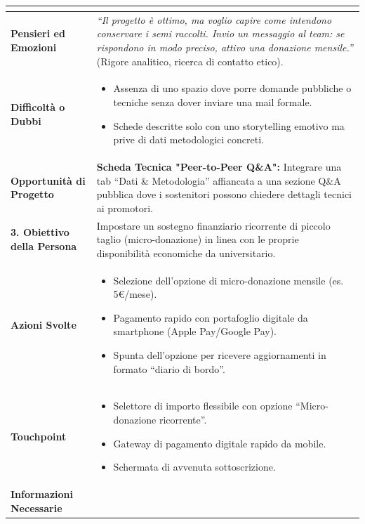 \documentclass[11pt,a4paper]{article}
\begin{document}
\begin{table}[h!]
\begin{tabular}{|p{3.2cm}|p{11.8cm}|}
\begin{itemize}[leftmargin=*,nosep]
\end{itemize} \\ \hline
\textbf{Pensieri ed Emozioni} &
\textit{``Il progetto è ottimo, ma voglio capire come intendono conservare i semi raccolti. Invio un messaggio al team: se rispondono in modo preciso, attivo una donazione mensile.''} (Rigore analitico, ricerca di contatto etico). \\ \hline
\textbf{Difficoltà o Dubbi} &
\begin{itemize}[leftmargin=*,nosep]
    \item Assenza di uno spazio dove porre domande pubbliche o tecniche senza dover inviare una mail formale.
    \item Schede descritte solo con uno storytelling emotivo ma prive di dati metodologici concreti.
\end{itemize} \\ \hline
\textbf{Opportunità di Progetto} &
\textbf{Scheda Tecnica "Peer-to-Peer Q\&A":} Integrare una tab ``Dati \& Metodologia'' affiancata a una sezione Q\&A pubblica dove i sostenitori possono chiedere dettagli tecnici ai promotori. \\ \hline
\hline
\textbf{3. Obiettivo della Persona} & Impostare un sostegno finanziario ricorrente di piccolo taglio (micro-donazione) in linea con le proprie disponibilità economiche da universitario. \\ \hline
\textbf{Azioni Svolte} &
\begin{itemize}[leftmargin=*,nosep]
    \item Selezione dell'opzione di micro-donazione mensile (es. 5€/mese).
    \item Pagamento rapido con portafoglio digitale da smartphone (Apple Pay/Google Pay).
    \item Spunta dell'opzione per ricevere aggiornamenti in formato ``diario di bordo''.
\end{itemize} \\ \hline
\textbf{Touchpoint} &
\begin{itemize}[leftmargin=*,nosep]
    \item Selettore di importo flessibile con opzione ``Micro-donazione ricorrente''.
    \item Gateway di pagamento digitale rapido da mobile.
    \item Schermata di avvenuta sottoscrizione.
\end{itemize} \\ \hline
\textbf{Informazioni Necessarie} &
\begin{itemize}[leftmargin=*,nosep]

\end{itemize}
\end{tabular}
\end{table}
\end{document}
